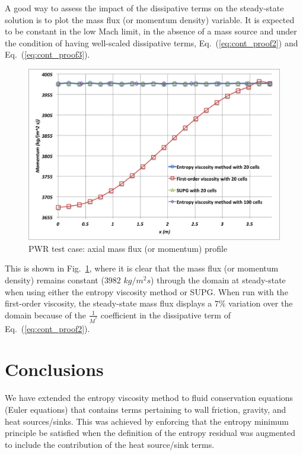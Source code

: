 \documentclass[12pt]{article}
\newcommand{\eqt}[1]{Eq.~(\ref{#1})} %
\newcommand{\fig}[1]{Fig.~\ref{#1}} %
\begin{document}
A good way to assess the impact of the dissipative terms on the steady-state solution is to plot the mass flux (or momentum density) variable. It is expected to be constant in the low Mach limit, in the absence of a mass source and under the condition of having well-scaled dissipative terms, \eqt{eq:cont_proof2} and \eqt{eq:cont_proof3}.

\begin{figure}[h]
\centering
\includegraphics[scale=0.4]{plots/Momentum.png}
\caption{PWR test case: axial mass flux (or momentum) profile}
\label{fig:Momentum}
\end{figure}
This is shown in \fig{fig:Momentum}, where it is clear that the mass flux (or momentum density) remains constant ($3982$ $kg/m^2s$) through the domain at steady-state when using either the entropy viscosity method or SUPG. When run with the first-order viscosity, the steady-state mass flux displays a $7\%$ variation over the domain because of the $\frac{1}{M^*}$ coefficient in the dissipative term of \eqt{eq:cont_proof2}.
%
\section{Conclusions} 
\label{sect::ccl}

We have extended the entropy viscosity method to fluid conservation equations (Euler equations) that contains terms pertaining to wall friction, gravity, and heat sources/sinks. This was achieved by enforcing that the entropy minimum principle be satisfied when the definition of the entropy residual was augmented to include the contribution of the heat source/sink terms.
\end{document}
